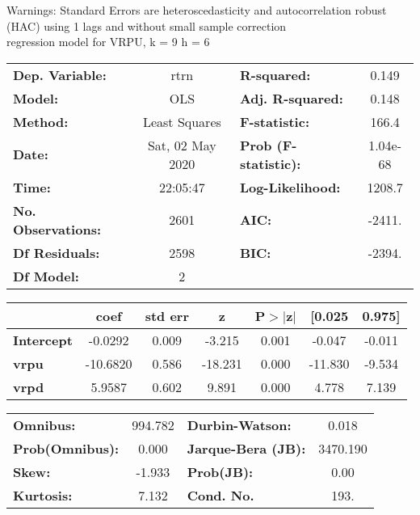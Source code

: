 Warnings: \newline
 [1] Standard Errors are heteroscedasticity and autocorrelation robust (HAC) using 1 lags and without small sample correction\\ 

regression model for VRPU, k = 9 h = 6\begin{center}
\begin{tabular}{lclc}
\toprule
\textbf{Dep. Variable:}    &       rtrn       & \textbf{  R-squared:         } &     0.149   \\
\textbf{Model:}            &       OLS        & \textbf{  Adj. R-squared:    } &     0.148   \\
\textbf{Method:}           &  Least Squares   & \textbf{  F-statistic:       } &     166.4   \\
\textbf{Date:}             & Sat, 02 May 2020 & \textbf{  Prob (F-statistic):} &  1.04e-68   \\
\textbf{Time:}             &     22:05:47     & \textbf{  Log-Likelihood:    } &    1208.7   \\
\textbf{No. Observations:} &        2601      & \textbf{  AIC:               } &    -2411.   \\
\textbf{Df Residuals:}     &        2598      & \textbf{  BIC:               } &    -2394.   \\
\textbf{Df Model:}         &           2      & \textbf{                     } &             \\
\bottomrule
\end{tabular}
\begin{tabular}{lcccccc}
                   & \textbf{coef} & \textbf{std err} & \textbf{z} & \textbf{P$> |$z$|$} & \textbf{[0.025} & \textbf{0.975]}  \\
\midrule
\textbf{Intercept} &      -0.0292  &        0.009     &    -3.215  &         0.001        &       -0.047    &       -0.011     \\
\textbf{vrpu}      &     -10.6820  &        0.586     &   -18.231  &         0.000        &      -11.830    &       -9.534     \\
\textbf{vrpd}      &       5.9587  &        0.602     &     9.891  &         0.000        &        4.778    &        7.139     \\
\bottomrule
\end{tabular}
\begin{tabular}{lclc}
\textbf{Omnibus:}       & 994.782 & \textbf{  Durbin-Watson:     } &    0.018  \\
\textbf{Prob(Omnibus):} &   0.000 & \textbf{  Jarque-Bera (JB):  } & 3470.190  \\
\textbf{Skew:}          &  -1.933 & \textbf{  Prob(JB):          } &     0.00  \\
\textbf{Kurtosis:}      &   7.132 & \textbf{  Cond. No.          } &     193.  \\
\bottomrule
\end{tabular}
\end{center}

